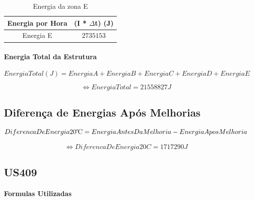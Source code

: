 \documentclass[12pt, a4paper]{article}
\begin{document}
\begin{table}[htpb]
	\begin{center}
		\begin{tabular}{c c}
			\toprule
			Energia por Hora 								 & 	(I * $\Delta$t) (J) \\
			\midrule
			Energia E 						               	     & $2735153$	 \\
			\bottomrule
		\end{tabular}
	\end{center}
	\caption{Energia da zona E}\label{tab:5seccaoEpotT28}
\end{table}

\vspace{11mm}
\paragraph{Energia Total da Estrutura}

\begin{equation}
	Energia Total(J) = Energia A + Energia B + Energia C + Energia D + Energia E
	\label{eq:5totalEnergia}
\end{equation}

\begin{equation}
	\Leftrightarrow Energia Total = 	21558827 J
	\label{eq:6totalEnergiaR}
\end{equation}

\vspace{15mm}

\subsection{Diferença de Energias Após Melhorias}
\begin{equation}
    Diferenca De Energia 20{\celsius} = EnergiaAntesDaMelhoria - EnergiaAposMelhoria
	\label{eq:diffEnergia}
\end{equation}

\begin{equation}
	\Leftrightarrow DiferencaDeEnergia20C  = 	1717290 J
	\label{eq:diffEnergiaT}
\end{equation}

\pagebreak
\subsection{US409}
\paragraph{Formulas Utilizadas}
\end{document}
